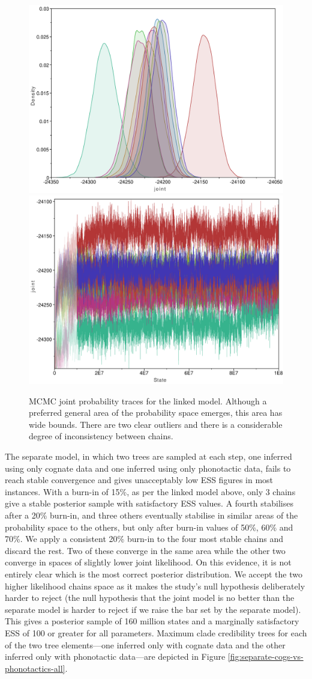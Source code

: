 \documentclass[]{article}
\begin{document}
\begin{figure}
\includegraphics[width=0.5\linewidth]{fig/joint_trace_dens_ch1-10} \includegraphics[width=0.5\linewidth]{fig/joint_trace_ch1-10} \caption{MCMC joint probability traces for the linked model. Although a preferred general area of the probability space emerges, this area has wide bounds. There are two clear outliers and there is a considerable degree of inconsistency between chains.}\label{fig:linked-all-trace}
\end{figure}

The separate model, in which two trees are sampled at each step, one inferred using only cognate data and one inferred using only phonotactic data, fails to reach stable convergence and gives unacceptably low ESS figures in most instances. With a burn-in of 15\%, as per the linked model above, only 3 chains give a stable posterior sample with satisfactory ESS values. A fourth stabilises after a 20\% burn-in, and three others eventually stabilise in similar areas of the probability space to the others, but only after burn-in values of 50\%, 60\% and 70\%. We apply a consistent 20\% burn-in to the four most stable chains and discard the rest. Two of these converge in the same area while the other two converge in spaces of slightly lower joint likelihood. On this evidence, it is not entirely clear which is the most correct posterior distribution. We accept the two higher likelihood chains space as it makes the study's null hypothesis deliberately harder to reject (the null hypothesis that the joint model is no better than the separate model is harder to reject if we raise the bar set by the separate model). This gives a posterior sample of 160 million states and a marginally satisfactory ESS of 100 or greater for all parameters. Maximum clade credibility trees for each of the two tree elements---one inferred only with cognate data and the other inferred only with phonotactic data---are depicted in Figure \ref{fig:separate-cogs-vs-phonotactics-all}.
\end{document}
